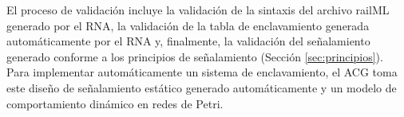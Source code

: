     El proceso de validación incluye la validación de la sintaxis del archivo railML generado por el RNA, la validación de la tabla de enclavamiento generada automáticamente por el RNA y, finalmente, la validación del señalamiento generado conforme a los principios de señalamiento (Sección \ref{sec:principios}). Para implementar automáticamente un sistema de enclavamiento, el ACG toma este diseño de señalamiento estático generado automáticamente y un modelo de comportamiento dinámico en redes de Petri. %



%
